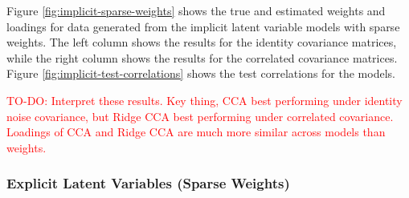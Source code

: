 Figure \ref{fig:implicit-sparse-weights} shows the true and estimated weights and \gls{loadings} for data generated from the implicit latent variable models with sparse weights.
The left column shows the results for the identity covariance matrices, while the right column shows the results for the correlated covariance matrices.
Figure \ref{fig:implicit-test-correlations} shows the test correlations for the models.

\textcolor{red}{TO-DO: Interpret these results. Key thing, CCA best performing under identity noise covariance, but Ridge CCA best performing under correlated covariance. Loadings of CCA and Ridge CCA are much more similar across models than weights.}



\subsubsection{Explicit Latent Variables (Sparse Weights)}

